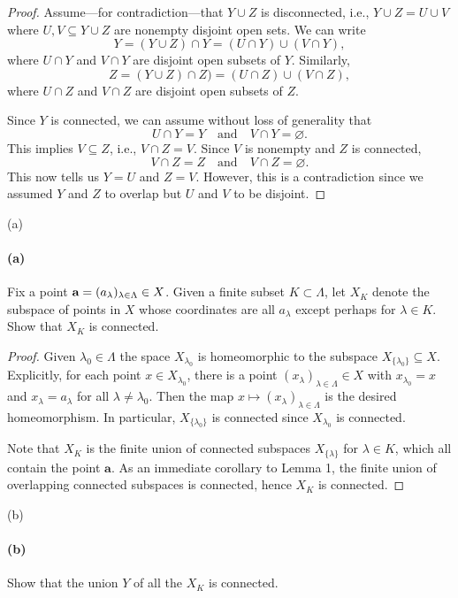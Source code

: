 \documentclass[12pt]{article}
\newlength{\myparskip}
\newenvironment{fullbox}{\begin{lrbox}{\savefullbox}\begin{minipage}{\dimexpr\textwidth-2\fboxsep\relax}\setlength{\parskip}{\myparskip}}{\end{minipage}\end{lrbox}\framebox[\textwidth]{\usebox{\savefullbox}}}
\newenvironment{pbox}[1][]{\begin{fullbox}\ifx#1\empty\else\paragraph{#1}\fi}{\end{fullbox}}
\newcommand{\isp}[1]{\quad\text{#1}\quad}
\renewcommand{\emptyset}{\varnothing}
\newcommand{\<}{\langle}
\renewcommand{\>}{\rangle}
\theoremstyle{definition}
\begin{document}
\begin{proof}
    Assume---for contradiction---that $Y \cup Z$ is disconnected, i.e., $Y \cup Z = U \cup V$ where $U, V \subseteq Y \cup Z$ are nonempty disjoint open sets.
    We can write
    \[
        Y = (Y \cup Z) \cap Y = (U \cap Y) \cup (V \cap Y),
    \]
    where $U \cap Y$ and $V \cap Y$ are disjoint open subsets of $Y$. Similarly, 
    \[
        Z = (Y \cup Z) \cap Z) = (U \cap Z) \cup (V \cap Z),
    \]
    where $U \cap Z$ and $V \cap Z$ are disjoint open subsets of $Z$.
    
    Since $Y$ is connected, we can assume without loss of generality that
    \[
        U \cap Y = Y \isp{and} V \cap Y = \emptyset.
    \]
    This implies $V \subseteq Z$, i.e., $V \cap Z = V$.
    Since $V$ is nonempty and $Z$ is connected,
    \[
        V \cap Z = Z \isp{and} V \cap Z = \emptyset.
    \]
    This now tells us $Y = U$ and $Z = V$. However, this is a contradiction since we assumed $Y$ and $Z$ to overlap but $U$ and $V$ to be disjoint.
\end{proof}

\begin{pbox}[(a)]
    Fix a point $\textbf a=(a_\lambda)_{\lambda \in \Lambda} \in X$.  Given a finite subset $K \subset \Lambda$, let $X_K$ denote the subspace
    of points in $X$ whose coordinates are all $a_\lambda$ except perhaps for
    $\lambda \in K$.  Show that $X_K$ is connected.
\end{pbox}

\begin{proof}
    Given $\lambda_0 \in \Lambda$ the space $X_{\lambda_0}$ is homeomorphic to the subspace $X_{\{\lambda_0\}} \subseteq X$. Explicitly, for each point $x \in X_{\lambda_0}$, there is a point $(x_\lambda)_{\lambda \in \Lambda} \in X$ with $x_{\lambda_0} = x$ and $x_\lambda = a_\lambda$ for all $\lambda \ne \lambda_0$.
    Then the map $x \mapsto (x_\lambda)_{\lambda \in \Lambda}$ is the desired homeomorphism.
    In particular, $X_{\{\lambda_0\}}$ is connected since $X_{\lambda_0}$ is connected.

    Note that $X_K$ is the finite union of connected subspaces $X_{\{\lambda\}}$ for $\lambda \in K$, which all contain the point $\mathbf{a}$.
    As an immediate corollary to Lemma 1, the finite union of overlapping connected subspaces is connected, hence $X_K$ is connected.
\end{proof}


\newpage
\begin{pbox}[(b)]
    Show that the union $Y$ of all the $X_K$ is connected.
\end{pbox}
\end{document}
